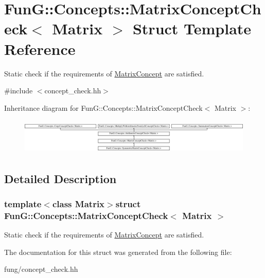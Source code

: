 \hypertarget{structFunG_1_1Concepts_1_1MatrixConceptCheck}{\section{Fun\-G\-:\-:Concepts\-:\-:Matrix\-Concept\-Check$<$ Matrix $>$ Struct Template Reference}
\label{structFunG_1_1Concepts_1_1MatrixConceptCheck}
}


Static check if the requirements of \hyperlink{structFunG_1_1Concepts_1_1MatrixConcept}{Matrix\-Concept} are satisfied.  




{\ttfamily \#include $<$concept\-\_\-check.\-hh$>$}

Inheritance diagram for Fun\-G\-:\-:Concepts\-:\-:Matrix\-Concept\-Check$<$ Matrix $>$\-:\begin{figure}[H]
\begin{center}
\leavevmode
\includegraphics[height=1.728395cm]{structFunG_1_1Concepts_1_1MatrixConceptCheck}
\end{center}
\end{figure}


\subsection{Detailed Description}
\subsubsection*{template$<$class Matrix$>$struct Fun\-G\-::\-Concepts\-::\-Matrix\-Concept\-Check$<$ Matrix $>$}

Static check if the requirements of \hyperlink{structFunG_1_1Concepts_1_1MatrixConcept}{Matrix\-Concept} are satisfied. 

The documentation for this struct was generated from the following file\-:\begin{DoxyCompactItemize}
\item 
fung/concept\-\_\-check.\-hh\end{DoxyCompactItemize}

